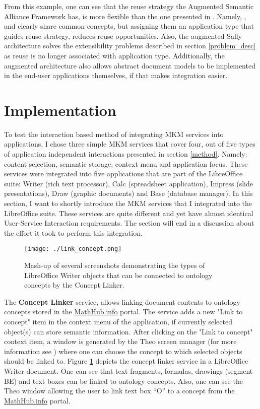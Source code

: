 \documentclass{llncs}
\begin{document}
From this example, one can see that the reuse strategy the Augmented Semantic Alliance Framework has, is more flexible than the one presented in \cite{DavJucKoh:safusa12}. Namely, ,  and  clearly share common concepts, but assigning them an application type that guides reuse strategy, reduces reuse opportunities. Also, the augmented Sally architecture solves the extensibility problems described in section \ref{problem_desc} as reuse is no longer associated with application type. Additionally, the augmented architecture also allows abstract document models to be implemented in the end-user applications themselves, if that makes integration easier. 

\section{Implementation}
\label{impl}
To test the interaction based method of integrating MKM services into applications, I chose three simple MKM services that cover four, out of five types of application independent interactions presented in section \ref{method}. Namely: content selection, semantic storage, context menu and application focus. These services were integrated into five applications that are part of the LibreOffice suite: Writer (rich text processor), Calc (spreadsheet application), Impress (slide presentations), Draw (graphic documents) and Base (database manager). In this section, I want to shortly introduce the MKM services that I integrated into the LibreOffice suite. These services are quite different and yet have almost identical User-Service Interaction requirements. The section will end in a discussion about the effort it took to perform this integration.

\begin{figure}
\centering
\texttt{[image: ./link\_concept.png]}
\caption{Mash-up of several screenshots demonstrating the types of LibreOffice Writer objects that can be connected to ontology concepts by the Concept Linker.}
\label{fig:concept_linker}
\end{figure}

The \textbf{Concept Linker} service, allows linking document contents to ontology concepts stored in the \url{MathHub.info}\cite{IanJucKoh:sdm14} portal. The service adds a new "Link to concept" item in the context menu of the application, if currently selected object(s) can store semantic information. After clicking on the "Link to concept" context item, a window is generated by the Theo screen manager (for more information see \cite{DavJucKoh:safusa12}) where one can choose the concept to which selected objects should be linked to. Figure \ref{fig:concept_linker} depicts the concept linker service in a LibreOffice Writer document. One can see that text fragments, formulas, drawings (segment BE) and text boxes can be linked to ontology concepts. Also, one can see the Theo window allowing the user to link text box ``O'' to a concept from the \url{MathHub.info} portal.
\end{document}
